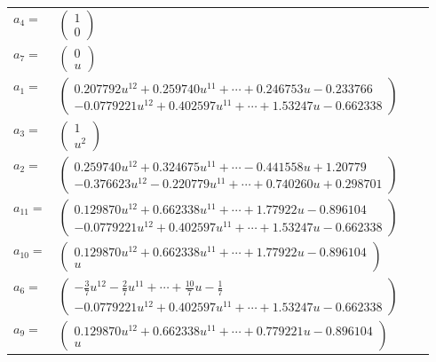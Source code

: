 \documentclass[1p]{elsarticle_modified}
\theoremstyle{definition}
\begin{document}
\begin{tabular}{m{7pt} m{180pt} m{7pt} m{180pt} }
\flushright $a_{4}=$&$\begin{pmatrix}1\\0\end{pmatrix}$ \\
\flushright $a_{7}=$&$\begin{pmatrix}0\\u\end{pmatrix}$ \\
\flushright $a_{1}=$&$\begin{pmatrix}0.207792 u^{12}+0.259740 u^{11}+\cdots+0.246753 u-0.233766\\-0.0779221 u^{12}+0.402597 u^{11}+\cdots+1.53247 u-0.662338\end{pmatrix}$ \\
\flushright $a_{3}=$&$\begin{pmatrix}1\\u^2\end{pmatrix}$ \\
\flushright $a_{2}=$&$\begin{pmatrix}0.259740 u^{12}+0.324675 u^{11}+\cdots-0.441558 u+1.20779\\-0.376623 u^{12}-0.220779 u^{11}+\cdots+0.740260 u+0.298701\end{pmatrix}$ \\
\flushright $a_{11}=$&$\begin{pmatrix}0.129870 u^{12}+0.662338 u^{11}+\cdots+1.77922 u-0.896104\\-0.0779221 u^{12}+0.402597 u^{11}+\cdots+1.53247 u-0.662338\end{pmatrix}$ \\
\flushright $a_{10}=$&$\begin{pmatrix}0.129870 u^{12}+0.662338 u^{11}+\cdots+1.77922 u-0.896104\\u\end{pmatrix}$ \\
\flushright $a_{6}=$&$\begin{pmatrix}-\frac{3}{7} u^{12}-\frac{2}{7} u^{11}+\cdots+\frac{10}{7} u-\frac{1}{7}\\-0.0779221 u^{12}+0.402597 u^{11}+\cdots+1.53247 u-0.662338\end{pmatrix}$ \\
\flushright $a_{9}=$&$\begin{pmatrix}0.129870 u^{12}+0.662338 u^{11}+\cdots+0.779221 u-0.896104\\u\end{pmatrix}$ \\

\end{tabular}
\end{document}
